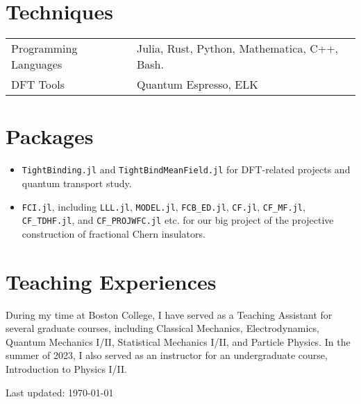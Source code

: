 \documentclass[letterpaper]{article}
\begin{document}
\section*{Techniques}
    \begin{tabular}{ll}
        Programming Languages & Julia, Rust, Python, Mathematica, C++, Bash.\\
        DFT Tools & Quantum Espresso, ELK\\
    \end{tabular}

\section*{Packages}
    \begin{itemize}
        \item \texttt{TightBinding.jl} and \texttt{TightBindMeanField.jl} for DFT-related projects and quantum transport study.
        \item \texttt{FCI.jl}, including \texttt{LLL.jl}, \texttt{MODEL.jl}, \texttt{FCB\_ED.jl}, \texttt{CF.jl}, \texttt{CF\_MF.jl}, \texttt{CF\_TDHF.jl}, and \texttt{CF\_PROJWFC.jl} etc. for our big project of the projective construction of fractional Chern insulators.
    \end{itemize}



\section*{Teaching Experiences}
    During my time at Boston College, I have served as a Teaching Assistant for several graduate courses, including Classical Mechanics, Electrodynamics, Quantum Mechanics I/II, Statistical Mechanics I/II, and Particle Physics. In the summer of 2023, I also served as an instructor for an undergraduate course, Introduction to Physics I/II.



\begin{center}
  \begin{footnotesize}
    Last updated: \today 
  \end{footnotesize}
\end{center}
\end{document}
